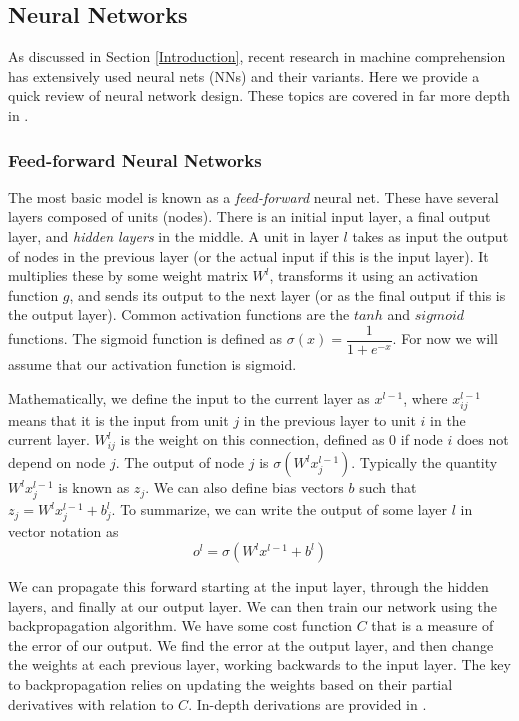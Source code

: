 \documentclass[pageno]{final_paper}
\begin{document}
\subsection{Neural Networks}
\label{Neural Networks}

As discussed in Section \ref{Introduction}, recent research in machine
comprehension has extensively used neural nets (NNs) and their variants. Here we
provide a quick review of neural network design. These topics are covered in far
more depth in \cite{Bishop1995, Nielsen2015}.

\subsubsection{Feed-forward Neural Networks}
\label{Feed-forward Neural Networks}

The most basic model is known as a \textit{feed-forward} neural net. These have
several layers composed of units (nodes). There is an initial input layer, a
final output layer, and \textit{hidden layers} in the middle. A unit in layer
$l$ takes as input the output of nodes in the previous layer (or the actual
input if this is the input layer). It multiplies these by some weight matrix
$W^l$, transforms it using an activation function $g$, and sends its output to the
next layer (or as the final output if this is the output layer). Common
activation functions are the $tanh$ and $sigmoid$ functions. The sigmoid
function is defined as $\sigma (x) = \dfrac{1}{1+e^{-x}}$. For now we will assume
that our activation function is sigmoid.

Mathematically, we define the input to the current layer as $x^{l-1}$, where
$x^{l-1}_{ij}$ means that it is the input from unit $j$ in the previous layer to
unit $i$ in the current layer. $W^l_{ij}$ is the weight on this connection,
defined as 0 if node $i$ does not depend on node $j$. The output of node $j$ is
$\sigma ( W^l x^{l-1}_j)$. Typically the quantity $W^lx^{l-1}_j$ is known as
$z_j$. We can also define bias vectors $b$ such that $z_j = W^lx^{l-1}_j +
b^l_j$. To summarize, we can write the output of some layer $l$ in vector
notation as $$o^l = \sigma(W^lx^{l-1} + b^l)$$

We can propagate this forward starting at the input layer, through the hidden
layers, and finally at our output layer. We can then train our network using the
backpropagation algorithm. We have some cost function $C$ that is a measure of
the error of our output. We find the error at the output layer, and then change
the weights at each previous layer, working backwards to the input layer. The
key to backpropagation relies on updating the weights based on their partial
derivatives with relation to $C$. In-depth derivations are provided in
\cite{Bishop1995, Nielsen2015}.
\end{document}
